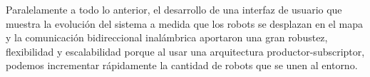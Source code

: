 Paralelamente a todo lo anterior, el desarrollo de una interfaz de usuario que muestra la evolución del sistema a medida que los robots se desplazan en el mapa y la comunicación bidireccional inalámbrica aportaron una gran robustez, flexibilidad y escalabilidad porque al usar una arquitectura productor-subscriptor, podemos incrementar rápidamente la cantidad de robots que se unen al entorno.